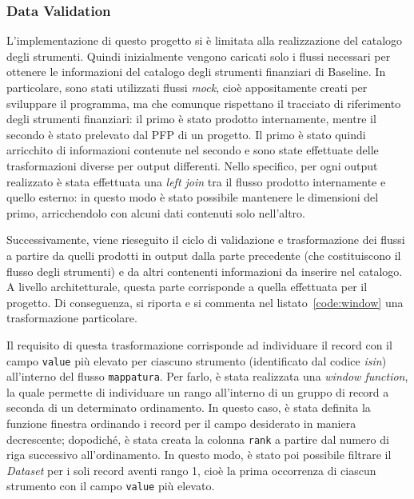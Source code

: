 \subsubsection{Data Validation}\label{subsubsec:baseline-data}
L'implementazione di questo progetto si è limitata alla realizzazione del catalogo degli strumenti.
Quindi inizialmente vengono caricati solo i flussi necessari per ottenere le informazioni del catalogo degli strumenti finanziari di Baseline.
In particolare, sono stati utilizzati flussi \textit{mock}, cioè appositamente creati per sviluppare il programma, ma che comunque rispettano il tracciato di riferimento degli strumenti finanziari:
il primo è stato prodotto internamente, mentre il secondo è stato prelevato dal PFP di un progetto.
Il primo è stato quindi arricchito di informazioni contenute nel secondo e sono state effettuate delle trasformazioni diverse per output differenti.
Nello specifico, per ogni output realizzato è stata effettuata una \textit{left join} tra il flusso prodotto internamente e quello esterno:
in questo modo è stato possibile mantenere le dimensioni del primo, arricchendolo con alcuni dati contenuti solo nell'altro.

Successivamente, viene rieseguito il ciclo di validazione e trasformazione dei flussi a partire da quelli prodotti in output dalla parte precedente (che costituiscono il flusso degli strumenti) e da altri contenenti informazioni da inserire nel catalogo.
A livello architetturale, questa parte corrisponde a quella effettuata per il progetto.
Di conseguenza, si riporta e si commenta nel listato~\ref{code:window} una trasformazione particolare.



Il requisito di questa trasformazione corrisponde ad individuare il record con il campo \texttt{value} più elevato per ciascuno strumento (identificato dal codice \textit{isin}) all'interno del flusso \texttt{mappatura}.
Per farlo, è stata realizzata una \textit{window function}, la quale permette di individuare un rango all'interno di un gruppo di record a seconda di un determinato ordinamento.
In questo caso, è stata definita la funzione finestra ordinando i record per il campo desiderato in maniera decrescente;
dopodiché, è stata creata la colonna \texttt{rank} a partire dal numero di riga successivo all'ordinamento.
In questo modo, è stato poi possibile filtrare il \textit{Dataset} per i soli record aventi rango 1, cioè la prima occorrenza di ciascun strumento con il campo \texttt{value} più elevato.

